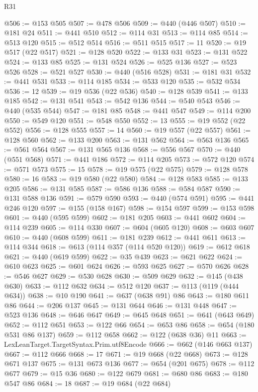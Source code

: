 \begin{lexlean}{R31}
\begin{coremodule}
@506 := @153 @505
@507 := @478 @506
@509 := @440 (@446 @507)
@510 := @181 @24
@511 := @441 @510
@512 := @114 @31
@513 := @114 @85
@514 := @513 @120
@515 := @512 @514
@516 := @511 @515
@517 := 11
@520 := @19 @517 (@22 @517)
@521 := @128 @520
@522 := @133 @31
@523 := @131 @522
@524 := @133 @85
@525 := @131 @524
@526 := @525 @136
@527 := @523 @526
@528 := @521 @527
@530 := @440 (@516 @528)
@531 := @181 @31
@532 := @441 @531
@533 := @114 @185
@534 := @533 @120
@535 := @532 @534
@536 := 12
@539 := @19 @536 (@22 @536)
@540 := @128 @539
@541 := @133 @185
@542 := @131 @541
@543 := @542 @136
@544 := @540 @543
@546 := @440 (@535 @544)
@547 := @181 @85
@548 := @441 @547
@549 := @114 @200
@550 := @549 @120
@551 := @548 @550
@552 := 13
@555 := @19 @552 (@22 @552)
@556 := @128 @555
@557 := 14
@560 := @19 @557 (@22 @557)
@561 := @128 @560
@562 := @133 @200
@563 := @131 @562
@564 := @563 @136
@565 := @561 @564
@567 := @131 @565 @136
@568 := @556 @567
@570 := @440 (@551 @568)
@571 := @441 @186
@572 := @114 @205
@573 := @572 @120
@574 := @571 @573
@575 := 15
@578 := @19 @575 (@22 @575)
@579 := @128 @578
@580 := 16
@583 := @19 @580 (@22 @580)
@584 := @128 @583
@585 := @133 @205
@586 := @131 @585
@587 := @586 @136
@588 := @584 @587
@590 := @131 @588 @136
@591 := @579 @590
@593 := @440 (@574 @591)
@595 := @441 @246 @120
@597 := @155 (@158 @167)
@598 := @154 @597
@599 := @153 @598
@601 := @440 (@595 @599)
@602 := @181 @205
@603 := @441 @602
@604 := @114 @239
@605 := @114 @330
@607 := @604 (@605 @120)
@608 := @603 @607
@610 := @440 (@608 @599)
@611 := @181 @239
@612 := @441 @611
@613 := @114 @344
@618 := @613 (@114 @357 (@114 @520 @120))
@619 := @612 @618
@621 := @440 (@619 @599)
@622 := @35 @439
@623 := @621 @622
@624 := @610 @623
@625 := @601 @624
@626 := @593 @625
@627 := @570 @626
@628 := @546 @627
@629 := @530 @628
@630 := @509 @629
@632 := @145 (@438 @630)
@633 := @112 @632
@634 := @512 @120
@637 := @113 (@119 (@444 @634))
@638 := @10 @190
@641 := @637 (@638 @91) @86
@643 := @180 @611 @86
@644 := @206 @137
@645 := @131 @644
@646 := @131 @448
@647 := @523 @136
@648 := @646 @647
@649 := @645 @648
@651 := @641 (@643 @649)
@652 := @112 @651
@653 := @122 @66
@654 := @653 @86
@658 := @654 (@180 @531 @86 @137)
@659 := @112 @658
@662 := @122 (@638 @36) @11
@663 := LexLeanTarget.TargetSyntax.Prim.utf8Encode
@666 := @662 (@146 @663 @137)
@667 := @112 @666
@668 := 17
@671 := @19 @668 (@22 @668)
@673 := @128 @671 @137
@675 := @131 @673 @136
@677 := @654 (@201 @675)
@678 := @112 @677
@679 := @15 @36
@680 := @122 @679
@681 := @680 @86
@683 := @180 @547 @86
@684 := 18
@687 := @19 @684 (@22 @684)

\end{coremodule}
\end{lexlean}
